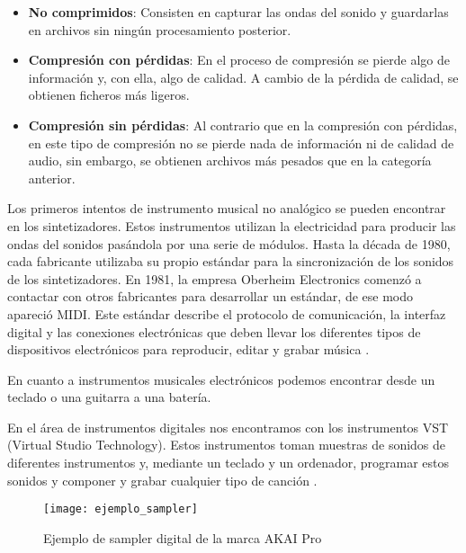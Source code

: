         \begin{itemize}
            \item \textbf{No comprimidos}: Consisten en capturar las ondas del sonido y guardarlas en archivos sin
            ningún procesamiento posterior.
            \item \textbf{Compresión con pérdidas}: En el proceso de compresión se pierde algo de información y, con
            ella, algo de calidad. A cambio de la pérdida de calidad, se obtienen ficheros más ligeros.
            \item \textbf{Compresión sin pérdidas}: Al contrario que en la compresión con pérdidas, en este tipo de
            compresión no se pierde nada de información ni de calidad de audio, sin embargo, se obtienen archivos más
            pesados que en la categoría anterior.
        \end{itemize}

        Los primeros intentos de instrumento musical no analógico se pueden encontrar en los sintetizadores. Estos
        instrumentos utilizan la electricidad para producir las ondas del sonidos pasándola por una serie de módulos.
        Hasta la década de 1980, cada fabricante utilizaba su propio estándar para la sincronización de los sonidos de
        los sintetizadores. En 1981, la empresa Oberheim Electronics comenzó a contactar con otros fabricantes para
        desarrollar un estándar, de ese modo apareció MIDI. Este estándar describe el protocolo de comunicación, la
        interfaz digital y las conexiones electrónicas que deben llevar los diferentes tipos de dispositivos
        electrónicos para reproducir, editar y grabar música \cite{midi_wikipedia}.

        En cuanto a instrumentos musicales electrónicos podemos encontrar desde un teclado o una guitarra a una batería.

        En el área de instrumentos digitales nos encontramos con los instrumentos VST (Virtual Studio Technology). Estos
        instrumentos toman muestras de sonidos de diferentes instrumentos y, mediante un teclado y un ordenador,
        programar estos sonidos y componer y grabar cualquier tipo de canción \cite{historia_instrumentos_digitales}.

        \begin{figure}[ht]
            \centering
            \texttt{[image: ejemplo\_sampler]}
            \caption{Ejemplo de sampler digital de la marca AKAI Pro \cite{akai_pro_imagen}\label{fig:EjemploSampler}}
        \end{figure}

